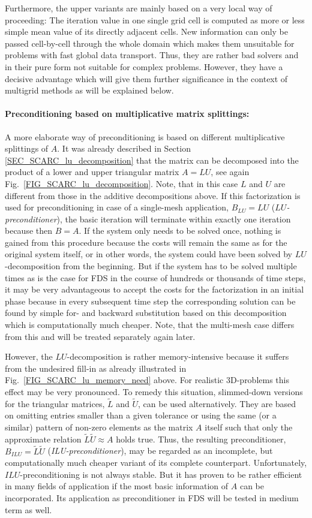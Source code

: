 Furthermore, the upper variants are mainly based on a very local way of proceeding: The iteration value in one single grid cell is computed as more or less simple mean value of its directly adjacent cells. New information can only be passed cell-by-cell through the whole domain which makes them unsuitable for problems with fast global data transport. Thus, they are rather bad solvers and in their pure form not suitable for complex problems. However, they have a decisive advantage which will give them further significance in the context of multigrid methods as will be explained below.

\paragraph{Preconditioning based on multiplicative matrix splittings:}
A more elaborate way of preconditioning is based on different multiplicative splittings of $A$. 
It was already described in Section \ref{SEC_SCARC_lu_decomposition} that the matrix can be decomposed into the product of a lower and upper triangular matrix $A=LU$, see again Fig.~\ref{FIG_SCARC_lu_decomposition}. Note, that in this case $L$ and $U$ are different from those in the additive decompositions above. 
If this factorization is used for preconditioning in case of a single-mesh application, $B_{LU}=LU$  ({\it $LU$-preconditioner}), the basic iteration will terminate within exactly one iteration because then $B=A$. If the system only needs to be solved once, nothing is gained from this procedure because the costs will remain the same as for the original system itself, or in other words, the system could have been solved by $LU$-decomposition from the beginning. 
%
But if the system has to be solved multiple times as is the case for FDS in the course of hundreds or thousands of time steps, it may be very advantageous to accept the costs for the factorization in an initial phase because in every subsequent time step the corresponding solution can be found by simple for- and backward substitution based on this decomposition which is computationally much cheaper. Note, that the multi-mesh case differs from this and will be treated separately again later.


However, the $LU$-decomposition is rather memory-intensive because it suffers from the undesired fill-in as already illustrated in Fig.~\ref{FIG_SCARC_lu_memory_need} above. For realistic 3D-problems this effect may be very pronounced. To remedy this situation, slimmed-down versions for the triangular matrices, $\tilde{L}$ and $\tilde{U}$, can be used alternatively. They are based on 
omitting entries smaller than a given tolerance or using the same (or a similar) pattern of non-zero elements as the matrix $A$ itself such that only the approximate relation $\tilde{L}\tilde{U}\approx A$ holds true. Thus, the resulting preconditioner, $B_{ILU} = \tilde{L}\tilde{U}$ ({\it ILU-preconditioner}), may be regarded as an incomplete, but computationally much cheaper variant of its complete counterpart. 
Unfortunately, $ILU$-preconditioning is not always stable. But it has proven to be rather efficient in many fields of application if the most basic information of $A$ can be incorporated. Its application as preconditioner in FDS will be tested in medium term as well.

